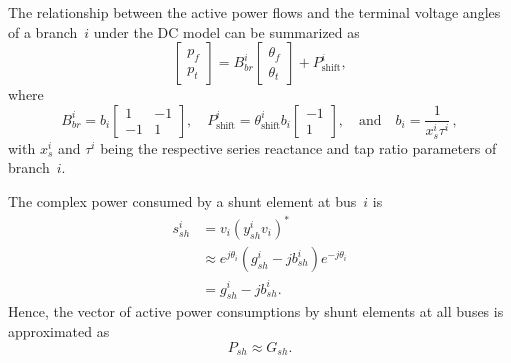 \documentclass[12pt]{article}
\numberwithin{equation}{section}
\numberwithin{table}{section}
\numberwithin{figure}{section}
\begin{document}
The relationship between the active power flows and the terminal voltage angles
of a branch~$i$ under the DC model can be summarized as
\begin{equation}
  \begin{bmatrix} p_f \\ p_t \end{bmatrix}
  =
  B_{br}^i
  \begin{bmatrix} \theta_f \\ \theta_t \end{bmatrix}
  +
  P_\mathrm{shift}^i ,
\end{equation}
where
\begin{equation*}
  B_{br}^i = b_i \begin{bmatrix} 1 & -1 \\ -1 & 1 \end{bmatrix},
  \quad
  P_\mathrm{shift}^i
  = \theta^i_\mathrm{shift} b_i \begin{bmatrix} -1 \\ 1 \end{bmatrix},
  \quad \text{and} \quad
  b_i = \frac{1}{x^i_s \tau^i} \, ,
\end{equation*}
with $x_s^i$ and $\tau^i$ being the respective series reactance and tap ratio parameters of branch~$i$.

The complex power consumed by a shunt element at bus~$i$ is
\begin{align}
  s^i_{sh}
  & = v_i (y^i_{sh} v_i)^* \\ \nonumber
  & \approx e^{j \theta_i} \left( g^i_{sh} - j b^i_{sh} \right) e^{-j \theta_i} \\ \nonumber
  & = g^i_{sh} - j b^i_{sh}.
\end{align}
Hence, the vector of active power consumptions by shunt elements at all buses is approximated as
\begin{equation}
P_{sh} \approx G_{sh}.
\end{equation}
\end{document}
